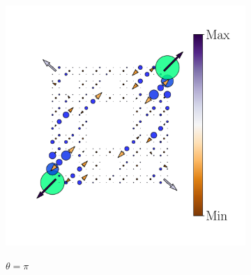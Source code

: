 \begin{figure}[h!]
\begin{minipage}[h!]{1.1\textwidth}
\begin{subfigure}[b!]{0.2 \textwidth}
             \label{}
         \end{subfigure}\hspace*{-0.5em}
          \begin{subfigure}[b!]{0.2 \textwidth}
             \caption*{$\theta = \pi$}
             \includegraphics[width=\textwidth]{Imagenes/Resultados_pump_Fractal/x/hoti_pomp_x_neg5.pdf}
             \label{}
         \end{subfigure}\hspace*{-0.5em}
     \end{minipage}\vspace*{-1em}
     
    
     
     
    \caption{}
    \label{fig:Proy_pump_fractal_xy}
\end{figure}